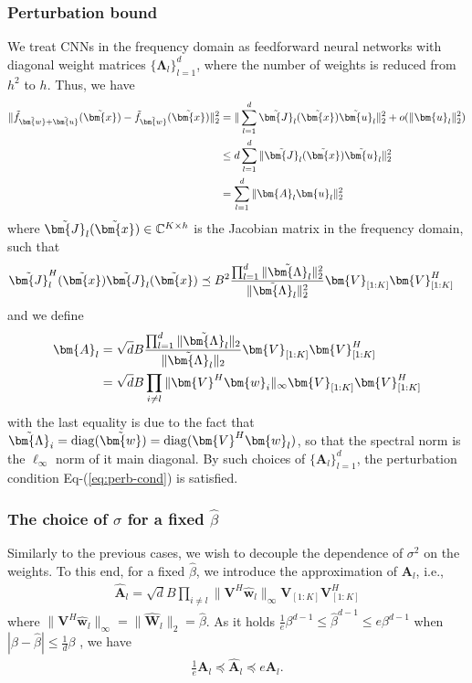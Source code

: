 \documentclass[journal]{IEEEtran} %
\def\eqref#1{Eq-(\ref{#1})}
\def\vu{{\bm{u}}}
\def\vw{{\bm{w}}}
\def\vx{{\bm{x}}}
\def\mA{{\bm{A}}}
\def\mJ{{\bm{J}}}
\def\mV{{\bm{V}}}
\def\mW{{\bm{W}}}
\def\mLambda{{\bm{\Lambda}}}
\newcommand{\Norm}[1]{\|#1\|}
\newcommand{\Abs}[1]{|#1|}
\begin{document}
\subsubsection{Perturbation bound}
We treat CNNs in the frequency domain as feedforward neural networks with diagonal weight matrices $\{\mLambda_l\}_{l=1}^d$, where the number of weights is reduced from $h^2$ to $h$.
Thus, we have
\begin{align}
\Norm{\Tilde{f}_{\Tilde{\vw}+\Tilde{\vu}}(\Tilde{\vx})-\Tilde{f}_{\Tilde{\vw}}(\Tilde{\vx})}_2^2 &= \Norm{\sum_{l=1}^d \Tilde{\mJ}_l(\Tilde{\vx}) \Tilde{\vu}_l}_2^2+ o(\Norm{\vu_l}_2^2)\\
    &\le d \sum_{l=1}^d \Norm{\Tilde{\mJ}_l(\Tilde{\vx}) \Tilde{\vu}_l}_2^2\\
    &= \sum_{l=1}^d \Norm{\mA_l \vu_l}_2^2
\end{align}
where $\Tilde{\mJ}_l(\Tilde{\vx}) \in \mathbb{C}^{K \times h}$ is the Jacobian matrix in the frequency domain, such that
\begin{align}
    \Tilde{\mJ}_l^H(\Tilde{\vx}) \Tilde{\mJ}_l(\Tilde{\vx}) &\preceq B^2  \frac{\prod_{l=1}^d \Norm{\Tilde{\mLambda}_l}_2^2}{\Norm{\Tilde{\mLambda}_l}_2^2} \mV_{[1:K]} \mV_{[1:K]}^H
\end{align}
and we define
\begin{align}
    \mA_l &= \sqrt{d} B \frac{\prod_{l=1}^d \Norm{\Tilde{\mLambda}_l}_2}{\Norm{\Tilde{\mLambda}_l}_2} \mV_{[1:K]} \mV_{[1:K]}^H \\
    &= \sqrt{d} B \prod_{i\ne l} \Norm{\mV^H \vw_i}_{\infty} \mV_{[1:K]} \mV_{[1:K]}^H
\end{align}
with the last equality is due to the fact that $\Tilde{\mLambda}_i=\mathrm{diag}(\Tilde{\vw})=\mathrm{diag}(\mV^H \vw_l)$,  
so that the spectral norm is the $\ell_{\infty}$ norm of it main diagonal. By such choices of $\{\mA_l\}_{l=1}^d$, the perturbation condition \eqref{eq:perb-cond} is satisfied. 
%
\subsubsection{The choice of $\sigma$ for a fixed $\hat{\beta}$}
Similarly to the previous cases, we wish to decouple the dependence of $\sigma^2$ on the weights. To this end, for a fixed $\hat{\beta}$, we introduce the approximation of $\mA_l$, i.e., 
\begin{align}
    \hat{\mA}_l = \sqrt{d} B \prod_{i\ne l} \Norm{\mV^H \hat{\vw}_l}_{\infty} \mV_{[1:K]} \mV_{[1:K]}^H
\end{align}
where $\Norm{\mV^H \hat{\vw}_l}_{\infty}=\Norm{\hat{\mW}_l}_2=\hat{\beta}$.
% 
As it holds $\frac{1}{e} \beta^{d-1} \le \hat{\beta}^{d-1} \le e\beta^{d-1}$ when $\Abs{\beta-\hat{\beta}} \le \frac{1}{d}\beta$ \cite{neyshabur2018pac}, we have
\begin{align}
   \frac{1}{e} \mA_l \preceq \hat{\mA}_l \preceq e \mA_l.
\end{align}
\end{document}
